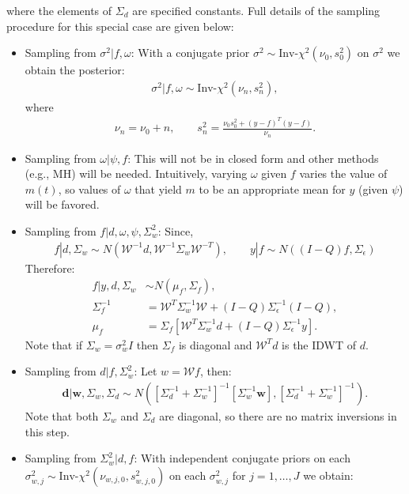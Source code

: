 \documentclass[a4paper,11pt]{article}
\begin{document}
where the elements of $\Sigma_{d}$ are specified constants. Full details of the sampling procedure for this special case are given below:
\begin{itemize}
\item Sampling from $\sigma^{2}|f,\omega$: With a conjugate prior $\sigma^{2}\sim\textrm{Inv-}\chi^{2}(\nu_{0},s_{0}^{2})$ on $\sigma^{2}$ we obtain the posterior:
\begin{align*}
 \sigma^{2} | f,\omega \sim \textrm{Inv-}\chi^{2}(\nu_{n},s_{n}^{2}) ,
\end{align*} 
where 
\begin{align*}
 \nu_{n} = \nu_{0} + n , \qquad s_{n}^{2} = \frac{\nu_{0}s_{0}^{2}+(y-f)^{T}(y-f)}{\nu_{n}} .
\end{align*}
\item Sampling from $\omega|\psi,f$: This will not be in closed form and other methods (e.g., MH) will be needed. Intuitively, varying $\omega$ given $f$ varies the value of $m(t)$, so values of $\omega$ that yield $m$ to be an appropriate mean for $y$ (given $\psi$) will be favored.
\item Sampling from $f|d,\omega,\psi,\Sigma^{2}_{w}$: Since,
\begin{align*}
f|d,\Sigma_{w} \sim N\left(\mathcal{W}^{-1}d,\mathcal{W}^{-1}\Sigma_{w}\mathcal{W}^{-T}\right) , \qquad 
y|f \sim N\left((I-Q)f,\Sigma_{\epsilon}\right) 
\end{align*}
Therefore:
\begin{align*}
 f | y,d,\Sigma_{w} &\sim N\left(\mu_{f},\Sigma_{f}\right) , \\
 \Sigma_{f}^{-1} &= \mathcal{W}^{T}\Sigma_{w}^{-1}\mathcal{W} + (I-Q)\Sigma_{\epsilon}^{-1}(I-Q) ,\\
 \mu_{f} &= \Sigma_{f}\left[ \mathcal{W}^{T}\Sigma_{w}^{-1}d + (I-Q)\Sigma_{\epsilon}^{-1}y\right] .
\end{align*}
Note that if $\Sigma_{w}=\sigma^{2}_{w}I$ then $\Sigma_{f}$ is diagonal and $\mathcal{W}^{T}d$ is the IDWT of $d$.
\item Sampling from $d|f,\Sigma^{2}_{w}$: Let $w=\mathcal{W}f$, then:
\begin{align*}
 \mathbf{d} | \mathbf{w}, \Sigma_{w}, \Sigma_{d} \sim
   N\left(\left[\Sigma_{d}^{-1}+\Sigma_{w}^{-1}\right]^{-1}\left[\Sigma_{w}^{-1}\mathbf{w}\right],\left[\Sigma_{d}^{-1}+\Sigma_{w}^{-1}\right]^{-1}\right) .
 \end{align*}
 Note that both $\Sigma_{w}$ and $\Sigma_{d}$ are diagonal, so there are no matrix inversions in this step.
\item Sampling from $\Sigma^{2}_{w}|d,f$: With independent conjugate priors on each $\sigma^{2}_{w,j}\sim\textrm{Inv-}\chi^{2}(\nu_{w,j,0},s_{w,j,0}^{2})$ on each $\sigma^{2}_{w,j}$ for $j=1,\ldots,J$ we obtain:

\end{itemize}
\end{document}
